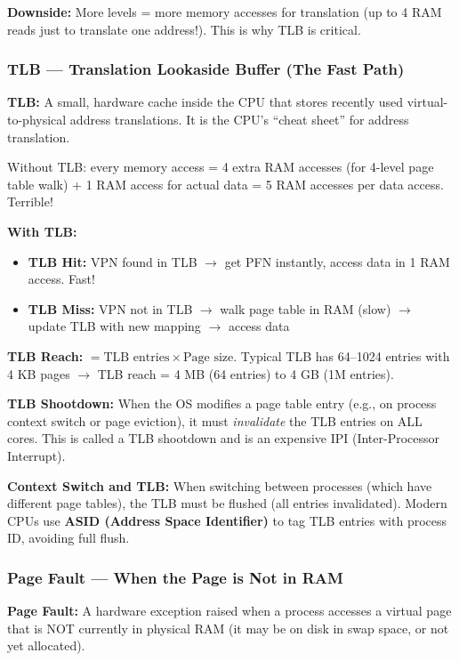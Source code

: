 \documentclass[11pt,a4paper]{article}
\newcommand{\term}[1]{\textbf{\color{darkblue}#1}}
\begin{document}
\textbf{Downside:} More levels = more memory accesses for translation (up to 4 RAM reads just to translate one address!). This is why TLB is critical.

\subsubsection{TLB --- Translation Lookaside Buffer (The Fast Path)}

\begin{mydef}
\textbf{TLB:} A small, hardware cache inside the CPU that stores recently used virtual-to-physical address translations. It is the CPU's ``cheat sheet'' for address translation.
\end{mydef}

Without TLB: every memory access = 4 extra RAM accesses (for 4-level page table walk) + 1 RAM access for actual data = 5 RAM accesses per data access. Terrible!

\textbf{With TLB:}
\begin{itemize}[noitemsep]
  \item \term{TLB Hit:} VPN found in TLB $\to$ get PFN instantly, access data in 1 RAM access. Fast!
  \item \term{TLB Miss:} VPN not in TLB $\to$ walk page table in RAM (slow) $\to$ update TLB with new mapping $\to$ access data
\end{itemize}

\textbf{TLB Reach:} $= \text{TLB entries} \times \text{Page size}$. Typical TLB has 64--1024 entries with 4 KB pages $\to$ TLB reach = 4 MB (64 entries) to 4 GB (1M entries).

\textbf{TLB Shootdown:} When the OS modifies a page table entry (e.g., on process context switch or page eviction), it must \textit{invalidate} the TLB entries on ALL cores. This is called a TLB shootdown and is an expensive IPI (Inter-Processor Interrupt).

\textbf{Context Switch and TLB:} When switching between processes (which have different page tables), the TLB must be flushed (all entries invalidated). Modern CPUs use \term{ASID (Address Space Identifier)} to tag TLB entries with process ID, avoiding full flush.

\subsubsection{Page Fault --- When the Page is Not in RAM}

\begin{mydef}
\textbf{Page Fault:} A hardware exception raised when a process accesses a virtual page that is NOT currently in physical RAM (it may be on disk in swap space, or not yet allocated).
\end{mydef}
\end{document}
